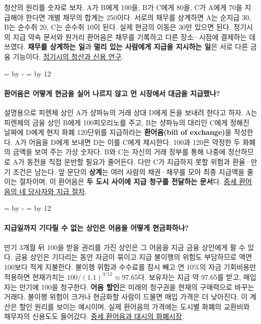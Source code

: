 \documentclass[10pt,a4paper]{article}
\newcommand{\ReserveQuestionSpace}{%
  \par\begingroup
  \dimen0=\pagegoal \advance\dimen0 by -\pagetotal
  \dimen2=\baselineskip \multiply\dimen2 by 12
  \ifdim\dimen0<\dimen2 \newpage\fi
  \endgroup}
\begin{document}
청산의 원리를 숫자로 보자. A가 B에게 100을, B가 C에게 80을, C가 A에게 70을 지급해야 한다면 개별 채무의 합계는 250이다. 서로의 채무를 상계하면 A는 순지급 30, B는 순수취 20, C는 순수취 10이 된다. 실제 현금의 이동은 30만 있으면 된다. 정기시의 지급 약속 문서와 원거리 환어음은 채무를 기록하고 다른 장소·시점에 결제하는 데 쓰였다. \textbf{채무를 상계하는 일}과 \textbf{멀리 있는 사람에게 지급을 지시하는 일}은 서로 다른 금융 기능이다. \href{https://bpb-us-e1.wpmucdn.com/sites.dartmouth.edu/dist/6/1163/files/2013/01/01-15.pdf}{정기시의 청산과 신용 연구}.\par

\ReserveQuestionSpace
\paragraph{환어음은 어떻게 현금을 실어 나르지 않고 먼 시장에서 대금을 지급했나?}
설명용으로 피렌체 상인 A가 샹파뉴의 거래 상대 D에게 돈을 보내려 한다고 하자. A는 피렌체의 금융 상인 B에게 100피오리노를 주고, B는 샹파뉴의 대리인 C에게 정해진 날짜에 D에게 현지 화폐 120단위를 지급하라는 \textbf{환어음(bill of exchange)}을 작성한다. A가 어음을 D에게 보내면 D는 이를 C에게 제시한다. 100과 120은 약정한 두 화폐의 금액을 보여 주는 가상 숫자다. B와 C는 자신의 거래 장부를 통해 나중에 정산하므로 A가 동전을 직접 운반할 필요가 줄어든다. 다만 C가 지급하지 못할 위험과 환율·만기 조건은 남는다. 앞 문단의 \textbf{상계}는 여러 사람의 채권·채무를 모아 최종 지급액을 줄이는 절차이며, 이 환어음은 \textbf{두 도시 사이에 지급 청구를 전달하는 문서}다. \href{https://memdb.libraries.rutgers.edu/node/322217}{중세 환어음의 네 당사자와 지급 절차}.\par

\ReserveQuestionSpace
\paragraph{지급일까지 기다릴 수 없는 상인은 어음을 어떻게 현금화하나?}
만기 3개월 뒤 100을 받을 권리를 가진 상인은 그 어음을 지금 금융 상인에게 팔 수 있다. 금융 상인은 기다리는 동안 자금이 묶이고 지급 불이행의 위험도 부담하므로 액면 100보다 적게 지불한다. 불이행 위험과 수수료를 잠시 빼고 연 10\%의 자금 기회비용만 적용하면 현재가치는 $100/(1.1)^{3/12}\approx97.65$다. 보유자는 지금 약 97.65를 받고, 매입자는 만기에 100을 청구한다. \textbf{어음 할인}은 미래의 청구권을 현재의 구매력으로 바꾸는 거래다. 불이행 위험이 크거나 현금화할 사람이 드물면 매입 가격은 더 낮아진다. 이 계산은 할인 원리를 보이는 예시이며, 실제 환어음의 가격에는 도시별 화폐의 교환비와 채무자의 신용도도 들어갔다. \href{https://memdb.libraries.rutgers.edu/node/322217}{중세 환어음과 대시의 화폐시장}.\par
\end{document}
